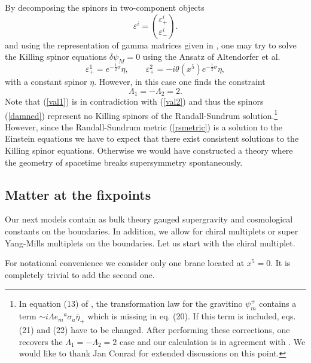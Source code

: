 \documentclass[a4paper,12pt, twoside]{article}
\numberwithin{equation}{section}
\begin{document}
By decomposing the spinors in two-component objects
\begin{equation}
\varepsilon^i=\binom{\varepsilon_+^i}{\varepsilon_-^i}.\label{zerl}
\end{equation}
and using the representation of gamma matrices given in 
\cite{Mirabelli:1998aj}, one may try to solve the Killing spinor equations 
$\delta\psi_M=0$ using the Ansatz of Altendorfer et al. \cite{Altendorfer:2000rr}
\begin{equation}
\varepsilon_+^1=e^{-\frac{1}{2}\sigma}\eta,\qquad 
\varepsilon_+^2=-i\theta(x^5)e^{-\frac{1}{2}\sigma}\eta,\label{damned}
\end{equation}
with a constant spinor $\eta$. However, in this case one finds the 
constraint 
\begin{equation}
\Lambda_1 = -\Lambda_2 =2.\label{val1}
\end{equation}
Note that (\ref{val1}) is in contradiction with (\ref{val2}) and thus 
the spinors (\ref{damned}) represent no Killing spinors of the 
Randall-Sundrum solution.\footnote{In equation (13) of 
\cite{Altendorfer:2000rr}, the transformation law for the gravitino $\psi_m^+$ contains a term 
$\sim i\Lambda e_m{}^a\sigma_a\bar{\eta}_+$ which is missing in eq. 
(20). If this term is included, eqs. (21) and (22) have to be changed. 
After performing these corrections, one recovers the $\Lambda_1 = 
-\Lambda_2 =2$ case and our calculation is in agreement with 
\cite{Altendorfer:2000rr}. We would like to thank Jan Conrad for extended discussions on 
this point.} However, since the Randall-Sundrum metric (\ref{rsmetric}) 
is a solution to the Einstein equations we have to expect that there 
exist consistent solutions to the Killing spinor equations. Otherwise we 
would have constructed a theory where the geometry of spacetime breaks 
supersymmetry spontaneously.

\subsection{Matter at the fixpoints}\label{matt}

Our next models contain as bulk theory gauged supergravity and 
cosmological constants on the boundaries. In addition, we allow for chiral 
multiplets or super Yang-Mills multiplets on the boundaries. Let us start 
with the chiral multiplet.

For notational convenience we consider only one brane located at 
$x^5=0$. It is completely trivial to add the second one.
\medskip
\end{document}
